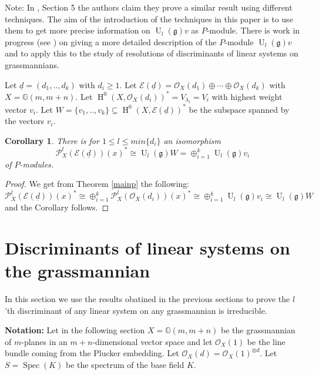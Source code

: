 \documentclass{amsart}
\theoremstyle{plain}
\newtheorem{corollary}[theorem]{Corollary}
\theoremstyle{definition}
\theoremstyle{remark}
\numberwithin{equation}{theorem}
\begin{document}
Note: In \cite{kallstrom}, Section 5 the authors claim they prove a similar
result using different techniques. The aim of the introduction of the
techniques in this paper is to use them to get more precise
information on ${\operatorname{U}}_l({\mathfrak{g}})v$ as $P$-module. There is work in progress
(see \cite{maa31}) on giving a more detailed description of the
$P$-module ${\operatorname{U}}_l({\mathfrak{g}})v$ and to apply this to the study of resolutions
of discriminants of linear systems on grassmannians.

Let $\underline{d}=(d_1,..,d_k)$ with $d_i\geq 1$. 
Let ${\mathcal{E}}(\underline{d})={\mathcal{O} }_X(d_1)\oplus \cdots \oplus
{\mathcal{O} }_X(d_k)$ with $X={\mathbb{G} }(m,m+n)$. Let
${\operatorname{H} }^0(X,{\mathcal{O} }_X(d_i))^*=V_{\lambda_i}=V_i$ with highest weight vector
$v_i$. Let $W=\{v_1,..,v_k\}\subseteq {\operatorname{H} }^0(X,{\mathcal{E}}(\underline{d}))^*$ be
the subspace spanned by the vectors $v_i$.
\begin{corollary} There is for $1\leq l \leq min\{d_i\}$ an
  isomorphism
\[ {\mathcal{P} }^l_X({\mathcal{E}}(\underline{d}))(x)^*\cong
{\operatorname{U}}_l({\mathfrak{g}})W=\oplus_{i=1}^k{\operatorname{U}}_l({\mathfrak{g}})v_i \]
of $P$-modules.
\end{corollary}
\begin{proof}
We get from Theorem \ref{mainp} the following:
\[ {\mathcal{P} }^l_X({\mathcal{E}}(\underline{d}))(x)^*\cong
\oplus_{i=1}^k{\mathcal{P} }^l_X({\mathcal{O} }_X(d_i))(x)^*\cong
\oplus_{i=1}^k{\operatorname{U}}_l({\mathfrak{g}})v_i\cong {\operatorname{U}}_l({\mathfrak{g}})W\]
and the Corollary follows.
\end{proof}

\section{Discriminants of linear systems on the grassmannian}

In this section we use the results obatined in the previous sections
to prove the $l$'th discriminant of any linear system on any
grassmannian is irreducible.

\textbf{Notation:} Let in the following section $X={\mathbb{G} }(m,m+n)$ be the grassmannian of $m$-planes in an
$m+n$-dimensional vector space and let ${\mathcal{O} }_X(1)$ be the line bundle
coming from the Plucker embedding. Let ${\mathcal{O} }_X(d)={\mathcal{O} }_X(1)^{\otimes
  d}$. Let $S={\operatorname{Spec} }(K)$ be the spectrum of the base field $K$.
\end{document}
